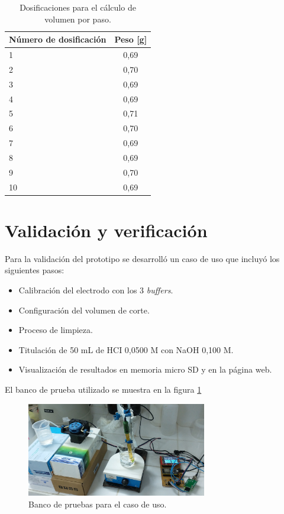 \begin{table}[h]
	\centering
	\caption[Dosificaciones]{Dosificaciones para el cálculo de volumen por paso.}
	\begin{tabular}{l c }    
		\toprule
		\textbf{Número de dosificación} & \textbf{Peso [g] } \\
		\midrule
		1 	& 0,69 \\	
		2	& 0,70 \\
		3	& 0,69 \\
		4	& 0,69 \\
		5	& 0,71 \\
		6	& 0,70 \\
		7	& 0,69 \\
		8	& 0,69 \\
		9	& 0,70 \\
		10	& 0,69 \\
		\bottomrule
		\hline
	\end{tabular}
	\label{tab:ensayoBomba}
\end{table}

\section{Validación y verificación}
\label{sec:validacionVerificacion}

Para la validación del prototipo se desarrolló un caso de uso que incluyó los siguientes pasos:
\begin{itemize}
	\item Calibración del electrodo con los 3 \textit{buffers}.
	\item Configuración del volumen de corte.
	\item Proceso de limpieza.
	\item Titulación de 50 mL de HCI 0,0500 M con NaOH 0,100 M.
	\item Visualización de resultados en memoria micro SD y en la página web.
\end{itemize}

El banco de prueba utilizado se muestra en la figura \ref{fig:bancoPruebasCompleto}

\begin{figure}[htbp]
	\centering
	\includegraphics[width=0.7\textwidth]{./Figures/casoTitulacion.jpg}
	\caption{Banco de pruebas para el caso de uso.}
	\label{fig:bancoPruebasCompleto}
\end{figure}

